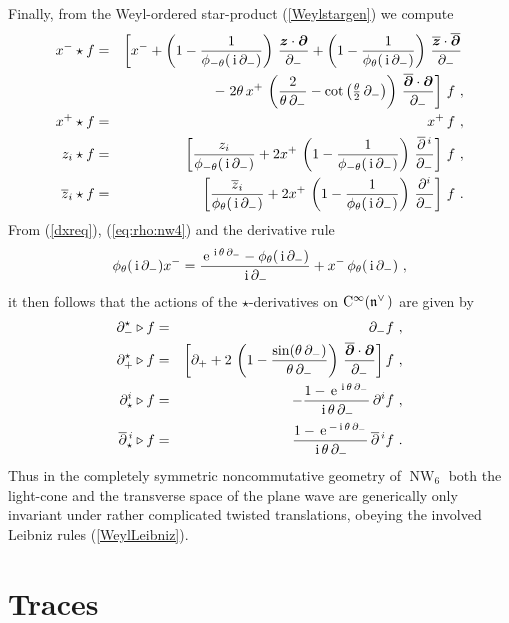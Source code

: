 \documentclass[11pt,a4paper]{article}
\DeclareMathOperator{\NW}{NW}
\newcommand{\1}{\mathbb{1}}
\newcommand{\mbf}[1]{{\boldsymbol {#1} }}
\def\ii{{\,{\rm i}\,}}
\def\CC{{\rm C}}
\def\mz{{\mbf z}}
\def\mdell{{\mbf\partial}}
\def\mfn{{\mathfrak n}}
\newcommand{\newsection}{\setcounter{equation}{0}\section}
\def\e{{\,\rm e}\,}
\def\bea{\begin{eqnarray}}
\def\eea{\end{eqnarray}}
\newcommand{\beq}{\begin{eqnarray}}
\newcommand{\eeq}{\end{eqnarray}}
\begin{document}
Finally, from the Weyl-ordered star-product (\ref{Weylstargen}) we
compute
\bea
x^-\star f&=&\left[x^-+\left(1-\frac1{\phi_{-\theta}(\ii\partial_-)}
\right)\,\frac{\mz\cdot\mdell}{\partial_-}+
\left(1-\frac1{\phi_{\theta}(\ii\partial_-)}
\right)\,\frac{\overline{\mz}\cdot\overline{\mdell}}{\partial_-}
\right.\nonumber\\ &&\qquad-\left.2\theta\,x^+\,\left(\frac{2}
{\theta\,\partial_-}-\cot\left(\mbox{$\frac\theta2\,\partial_-$}
\right)\right)\,\frac{\overline{\mdell}
\cdot\mdell}{\partial_-}\right]\,f \ , \nonumber\\
x^+\star f&=&x^+\,f \ , \nonumber\\
z_i\star f&=&\left[\frac{z_i}{\phi_{-\theta}(\ii\partial_-)}+
2x^+\,\left(1-\frac1{\phi_{-\theta}(\ii\partial_-)}\right)\,
\frac{\overline{\partial}{}^{\,i}}{\partial_-}\right]\,f \ ,
\nonumber\\ \overline{z}_i\star f&=&
\left[\frac{\overline{z}_i}{\phi_{\theta}(\ii\partial_-)}+
2x^+\,\left(1-\frac1{\phi_{\theta}(\ii\partial_-)}\right)\,
\frac{\partial^i}{\partial_-}\right]\,f \ .
\label{Weylxfprods}\eea
{}From (\ref{dxreq}), (\ref{eq:rho:nw4}) and the derivative rule
\beq
\phi_\theta(\ii\partial_-)x^-=
\frac{\e^{\ii\theta\,\partial_-}-\phi_\theta(\ii\partial_-)}
{\ii\partial_-}+x^-\,\phi_\theta(\ii\partial_-) \ ,
\label{derivrule2}\eeq
it then follows that the actions of the $\star$-derivatives on
$\CC^\infty(\mfn^{\vee\,})$ are given by
\bea
\partial_-^\star\triangleright f&=&\partial_-f \ , \nonumber\\
\partial_+^\star\triangleright f&=&\left[\partial_++2\,
\left(1-\frac{\sin(\theta\,\partial_-)}{\theta\,\partial_-}
\right)\,\frac{\overline{\mdell}\cdot\mdell}{\partial_-}
\right]f \ , \nonumber\\ \partial_\star^i\triangleright f&=&
-\frac{1-\e^{\ii\theta\,\partial_-}}{\ii\theta\,\partial_-}\,
\partial^if \ , \nonumber\\ \overline{\partial}{}_\star^{\,i}
\triangleright f&=&\frac{1-\e^{-\ii\theta\,\partial_-}}
{\ii\theta\,\partial_-}\,\overline{\partial}{}^{\,i}f \ .
\label{Weylderivs}\eea
Thus in the completely symmetric noncommutative geometry of $\NW_6$ both the
light-cone and the transverse space of the plane wave are generically
only invariant under rather complicated twisted translations, obeying
the involved Leibniz rules (\ref{WeylLeibniz}).

\newsection{Traces\label{Integrals}}
\end{document}
